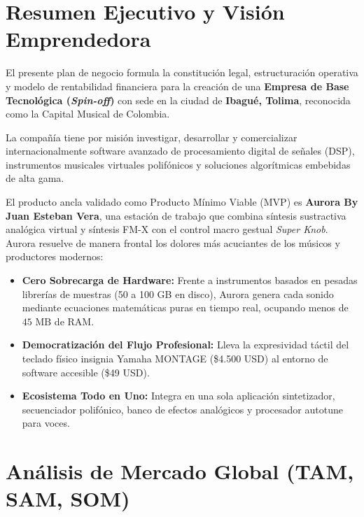 \documentclass[11pt,a4paper]{article}
\begin{document}
\newpage
\tableofcontents
\newpage

\section{Resumen Ejecutivo y Visión Emprendedora}

El presente plan de negocio formula la constitución legal, estructuración operativa y modelo de rentabilidad financiera para la creación de una \textbf{Empresa de Base Tecnológica (\textit{Spin-off})} con sede en la ciudad de \textbf{Ibagué, Tolima}, reconocida como la Capital Musical de Colombia. 

La compañía tiene por misión investigar, desarrollar y comercializar internacionalmente software avanzado de procesamiento digital de señales (DSP), instrumentos musicales virtuales polifónicos y soluciones algorítmicas embebidas de alta gama.

El producto ancla validado como Producto Mínimo Viable (MVP) es \textbf{Aurora By Juan Esteban Vera}, una estación de trabajo que combina síntesis sustractiva analógica virtual y síntesis FM-X con el control macro gestual \textit{Super Knob}. Aurora resuelve de manera frontal los dolores más acuciantes de los músicos y productores modernos:
\begin{itemize}[leftmargin=1.5cm]
    \item \textbf{Cero Sobrecarga de Hardware:} Frente a instrumentos basados en pesadas librerías de muestras (50 a 100 GB en disco), Aurora genera cada sonido mediante ecuaciones matemáticas puras en tiempo real, ocupando menos de $45\text{ MB}$ de RAM.
    \item \textbf{Democratización del Flujo Profesional:} Lleva la expresividad táctil del teclado físico insignia Yamaha MONTAGE (\$4.500 USD) al entorno de software accesible (\$49 USD).
    \item \textbf{Ecosistema Todo en Uno:} Integra en una sola aplicación sintetizador, secuenciador polifónico, banco de efectos analógicos y procesador autotune para voces.
\end{itemize}

\section{Análisis de Mercado Global (TAM, SAM, SOM)}
\end{document}
